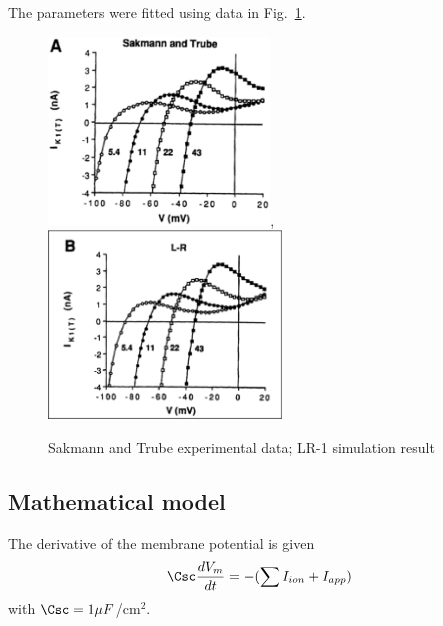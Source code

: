 The parameters were fitted using data in Fig.~\ref{fig:LR1_IK1T}. 

\begin{figure}[hbt]
  \centerline{\includegraphics[height=5cm,
    angle=0]{./images/ST_IK1T.eps}, \includegraphics[height=5cm,
    angle=0]{./images/LR1_IK1T.eps}}
\caption{Sakmann and Trube experimental data; LR-1 simulation result}
\label{fig:LR1_IK1T}
\end{figure}




\subsection{Mathematical model}
\label{sec:mathematical-model-10}

The derivative of the membrane potential is given
\begin{equation}
  \label{eq:723}
  \Csc\frac{dV_m}{dt} = -(\sum I_{ion}+I_{app})
\end{equation}
with $\Csc=1\mu F$/cm$^2$.

